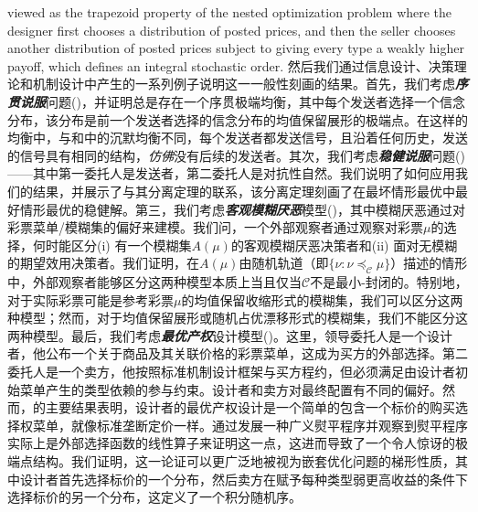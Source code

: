 \documentclass[12pt,letterpaper]{article}
\newenvironment{original}{\color{black}}{}
\newenvironment{translation}{\color{blue}}{}
\theoremstyle{plain}
\theoremstyle{definition}
\theoremstyle{remark}
\newcommand{\C}{\mathcal{C}}
\theoremstyle{definition}
\begin{document}
\begin{original}
viewed as the trapezoid property of the nested optimization problem where the designer first chooses a distribution of posted prices, and then the seller chooses another distribution of posted prices subject to giving every type a weakly higher payoff, which defines an integral stochastic order.
\end{original}
\begin{translation}
然后我们通过信息设计、决策理论和机制设计中产生的一系列例子说明这一一般性刻画的结果。首先，我们考虑\textit{\textbf{序贯说服}}问题(\citealt{LiNorman2021SequentialPersuasion})，并证明总是存在一个序贯极端均衡，其中每个发送者选择一个信念分布，该分布是前一个发送者选择的信念分布的均值保留展形的极端点。在这样的均衡中，与\citet{LiNorman2021SequentialPersuasion}和\citet{wu2023sequential}中的沉默均衡不同，每个发送者都发送信号，且沿着任何历史，发送的信号具有相同的结构，\textit{仿佛}没有后续的发送者。其次，我们考虑\textit{\textbf{稳健说服}}问题(\citealt{DworczakPavan2022RobustPersuasion})——其中第一委托人是发送者，第二委托人是对抗性自然。我们说明了如何应用我们的结果，并展示了与其分离定理的联系，该分离定理刻画了在最坏情形最优中最好情形最优的稳健解。第三，我们考虑\textit{\textbf{客观模糊厌恶}}模型(\citealt{olszewski2007preferences,Ahn2008AmbiguityWithoutStateSpace})，其中模糊厌恶通过对彩票菜单/模糊集的偏好来建模。我们问，一个外部观察者通过观察对彩票$\mu$的选择，何时能区分(i) 有一个模糊集$A(\mu)$的客观模糊厌恶决策者和(ii) 面对无模糊的期望效用决策者。我们证明，在$A(\mu)$由随机轨道（即$\{\nu: \nu \preceq_\C \mu\}$）描述的情形中，外部观察者能够区分这两种模型本质上当且仅当$\C$不是最小-封闭的。特别地，对于实际彩票可能是参考彩票$\mu$的均值保留收缩形式的模糊集，我们可以区分这两种模型；然而，对于均值保留展形或随机占优漂移形式的模糊集，我们不能区分这两种模型。最后，我们考虑\textit{\textbf{最优产权}}设计模型(\citealt{DworczakMuir2024})。这里，领导委托人是一个设计者，他公布一个关于商品及其关联价格的彩票菜单，这成为买方的外部选择。第二委托人是一个卖方，他按照标准机制设计框架与买方程约，但必须满足由设计者初始菜单产生的类型依赖的参与约束。设计者和卖方对最终配置有不同的偏好。然而，\citet{DworczakMuir2024}的主要结果表明，设计者的最优产权设计是一个简单的包含一个标价的购买选择权菜单，就像标准垄断定价一样。\citet{DworczakMuir2024}通过发展一种广义熨平程序并观察到熨平程序实际上是外部选择函数的线性算子来证明这一点，这进而导致了一个令人惊讶的极端点结构。我们证明，这一论证可以更广泛地被视为嵌套优化问题的梯形性质，其中设计者首先选择标价的一个分布，然后卖方在赋予每种类型弱更高收益的条件下选择标价的另一个分布，这定义了一个积分随机序。
\end{translation}
\end{document}
